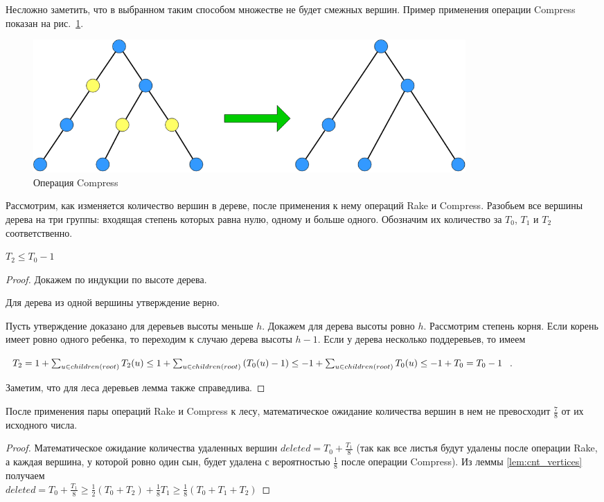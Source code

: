 Несложно заметить, что в выбранном таким способом множестве не будет смежных вершин.
Пример применения операции Compress показан на рис.~\ref{pic:compress}.

\begin{figure}[h]
\centering
\includegraphics[width=0.8\textwidth]{pics/compress.png}
\caption{Операция Compress}
\label{pic:compress}
\end{figure}

Рассмотрим, как изменяется количество вершин в дереве, после применения к нему операций Rake и Compress. 
Разобьем все вершины дерева на три группы: входящая степень которых равна нулю, одному и больше одного. Обозначим их количество за $T_0$, $T_1$ и $T_2$ соответственно.
\begin{lemma}
\label{lem:cnt_vertices}
  $T_2 \leq T_0 - 1$
\begin{proof}
  Докажем по индукции по высоте дерева. 
  
  Для дерева из одной вершины утверждение верно. 
  
  Пусть утверждение доказано для деревьев высоты меньше $h$. Докажем для дерева высоты ровно $h$. 
  Рассмотрим степень корня. Если корень имеет ровно одного ребенка, то переходим к случаю дерева высоты $h - 1$. Если у дерева несколько поддеревьев, 
  то имеем 
  
  $T_2 = 1 + \sum\nolimits_{u \in children(root)} {T_2 (u)} 
             \leq 1 + \sum\nolimits_{u \in children(root)} {(T_0 (u) - 1)} \\
             \leq -1 + \sum\nolimits_{u \in children(root)} {T_0 (u)} 
             \leq -1 + T_0 = T_0 - 1$. 
  
  Заметим, что для леса деревьев лемма также справедлива.
\end{proof}
\end{lemma}

\begin{lemma}
\label{lem:const_factor}
После применения пары операций Rake и Compress к лесу, математическое ожидание количества вершин в нем не превосходит $\frac{7}{8}$ от их исходного числа.
\begin{proof}
Математическое ожидание количества удаленных вершин $deleted = T_0 + \frac{T_1}{8}$ 
(так как все листья будут удалены после операции Rake, а каждая вершина, у которой ровно один сын, будет удалена с вероятностью $\frac{1}{8}$ после операции Compress). 
Из леммы \ref{lem:cnt_vertices} получаем\\ $deleted = T_0 + \frac{T_1}{8} \geq \frac{1}{2} (T_0 + T_2) + \frac{1}{8} T_1 \geq \frac{1}{8} (T_0 + T_1 + T_2)$
\end{proof}
\end{lemma}
 
